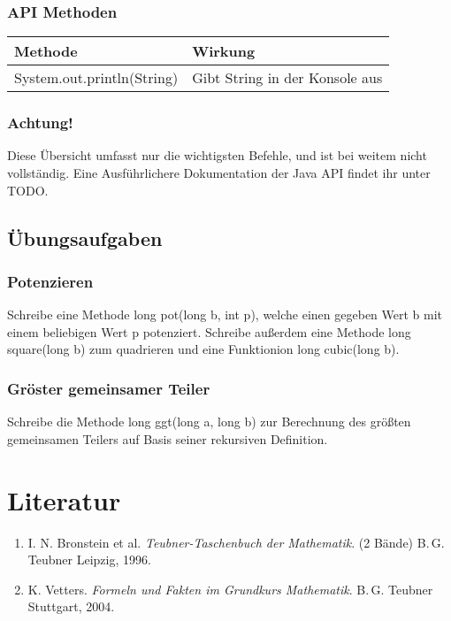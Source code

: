 		\subsubsection{API Methoden}
		\begin{tabular}{ll}
		\textbf{Methode} & \textbf{Wirkung}\\
		\hline
		System.out.println(String) & Gibt String in der Konsole aus\\
		
		\end{tabular}

		\subsubsection{Achtung!}
			Diese Übersicht umfasst nur die wichtigsten Befehle, und ist bei weitem nicht vollständig. Eine Ausführlichere Dokumentation der Java API findet ihr unter TODO.

	\subsection{Übungsaufgaben}
		\subsubsection{Potenzieren}
			Schreibe eine Methode long pot(long b, int p), welche einen gegeben Wert b mit einem beliebigen Wert p potenziert. Schreibe außerdem eine Methode long square(long b) zum quadrieren und eine Funktionion long cubic(long b).
		\subsubsection{Gröster gemeinsamer Teiler}
			Schreibe die Methode long ggt(long a, long b) zur Berechnung des größten gemeinsamen Teilers auf Basis seiner rekursiven Definition.


\section{Literatur}

\renewcommand{\labelenumi}{[\arabic{enumi}]}
\renewcommand{\theenumi}{[\arabic{enumi}]}
\begin{enumerate}
\item
I. N. Bronstein et al. \textit{Teubner-Taschenbuch der Mathematik}. (2 Bände)
B.\,G. Teubner Leipzig, 1996.

\item
K. Vetters. \textit{Formeln und Fakten im Grundkurs Mathematik}. B.\,G. Teubner Stuttgart, 2004.

\end{enumerate}
\pagestyle{scrplain}
\ofoot[]{}

\cleardoublepage
%

